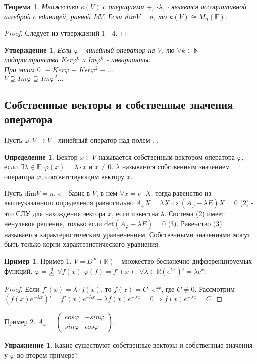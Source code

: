 \documentclass[a4paper, 12pt]{article}
\newcommand{\R}{\mathbb R}
\newcommand{\N}{\mathbb N}
\newcommand{\F}{\mathbb F}
\renewcommand{\phi}{\varphi}
\theoremstyle{definition}
\newtheorem*{definition}{Определение}
\newtheorem*{example1}{Пример}
\newtheorem*{exercise}{Упражнение}
\theoremstyle{plain}
\newtheorem*{theorem}{Теорема}
\newtheorem*{subtheorem}{Утверждение}
\theoremstyle{remark}
\begin{document}
  \begin{theorem}
    Множество $\kappa(V)$ с операциями $+$, $\cdot\lambda $, $\cdot$ является ассоциативной алгеброй с единицей, равной Id$V$.
    Если dim$V = n$, то $\kappa(V) \cong M_{n}(\F)$.
  \end{theorem}
  \begin{proof}
    Следует из утверждений 1 - 4.
  \end{proof}
  \begin{subtheorem}
    Если $\phi$ - линейный оператор на $V$, то $\forall k \in \N$ подпространства Ker$\phi^k$ и Im$\phi^k$ - инварианты.\\
    При этом {$0$} $\equiv Ker\phi \equiv Ker\phi^2 \equiv\ldots$\\
    $V \supseteq Im\phi \supseteq Im\phi^2\ldots$
  \end{subtheorem}
  \subsection{Собственные векторы и собственные значения оператора}
  Пусть $\phi: V \to V$ - линейный оператор над полем $\F$.
  \begin{definition}
    Вектор $x \in V$ называется собственным вектором оператора $\phi$, если $\exists\lambda\in \F: \phi(x) = \lambda \cdot x$ и $x\neq0$. $\lambda$ называется собственным значением оператора $\phi$, соответствующим вектору $x$.
  \end{definition}
  Пусть dim$V = n$, $e$ - базис в $V$, в нём $\forall x = e\cdot X$, тогда равенство из вышеуказанного определения равносильно $A_{\phi}X = \lambda X \Longleftrightarrow (A_{\phi} - \lambda E)X = 0$ (2) - это СЛУ для нахождения вектора $x$, если известна $\lambda$.
  Система (2) имеет ненулевое решение, только если det$(A_{\phi} - \lambda E) = 0$ (3).
  Равенство (3) называется характеристическим уравненением.
  Собственными значениями могут быть только корни характеристического уравнения.
  \begin{example1}
    Пример 1.
    $V = D^{\infty}(\R)$ - множество бесконечно дифференцируемых функций.
    $\phi = \frac{d}{dx}$ $\forall f(x)$ $\phi(f) = f'(x)$.
    $\forall\lambda\in\R (e^{\lambda x})' = \lambda e^x$.
    \begin{proof}
      Если $f'(x) = \lambda \cdot f(x)$, то $f(x) = C \cdot e^{\lambda x}$, где $C\neq0$.
      Рассмотрим $(f(x)e^{-\lambda x})' = f'(x)e^{-\lambda x} - \lambda f(x)e^{-\lambda x} = 0 \Longrightarrow f(x)e^{-\lambda x} = C$.
    \end{proof}
    Пример 2.
    $A_{\phi} = \begin{pmatrix}
      cos\phi & -sin\phi\\
      sin\phi & cos\phi
    \end{pmatrix}$.
    \begin{exercise}
      Какие существуют собственные векторы и собственные значения у $\phi$ во втором примере?
    \end{exercise}
  \end{example1}
\end{document}
